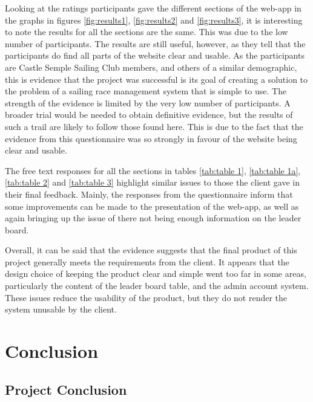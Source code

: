 \documentclass{l4proj}
\begin{document}
Looking at the ratings participants gave the different sections of the web-app in the graphs in figures \ref{fig:results1}, \ref{fig:results2} and \ref{fig:results3}, it is interesting to note the results for all the sections are the same. This was due to the low number of participants. The results are still useful, however, as they tell that the participants do find all parts of the website clear and usable. As the participants are Castle Semple Sailing Club members, and others of a similar demographic, this is evidence that the project was successful is its goal of creating a solution to the problem of a sailing race management system that is simple to use. The strength of the evidence is limited by the very low number of participants. A broader trial would be needed to obtain definitive evidence, but the results of such a trail are likely to follow those found here. This is due to the fact that the evidence from this questionnaire was so strongly in favour of the website being clear and usable.

The free text responses for all the sections in tables \ref{tab:table 1}, \ref{tab:table 1a}, \ref{tab:table 2} and \ref{tab:table 3} highlight similar issues to those the client gave in their final feedback. Mainly, the responses from the questionnaire inform that some improvements can be made to the presentation of the web-app, as well as again bringing up the issue of there not being enough information on the leader board.

Overall, it can be said that the evidence suggests that the final product of this project generally meets the requirements from the client. It appears that the design choice of keeping the product clear and simple went too far in some areas, particularly the content of the leader board table, and the admin account system. These issues reduce the usability of the product, but they do not render the system unusable by the client.



\chapter{Conclusion}

\section{Project Conclusion}
\end{document}
